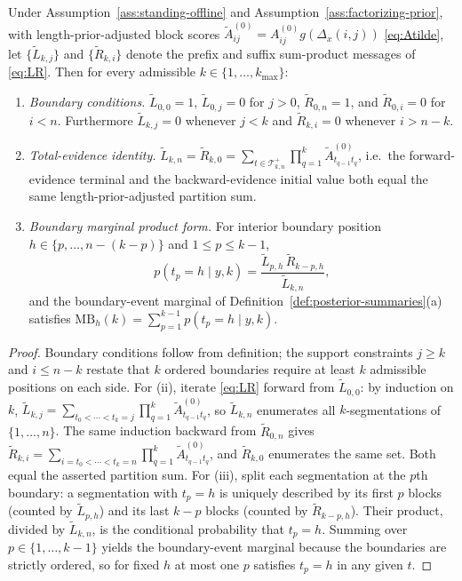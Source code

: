 \begin{proposition}
\label{prop:fb-duality}
Under Assumption~\ref{ass:standing-offline} and Assumption~\ref{ass:factorizing-prior}, with
length-prior-adjusted block scores $\widetilde A^{(0)}_{ij}=A^{(0)}_{ij}g(\Delta_x(i,j))$
\eqref{eq:Atilde}, let $\{\widetilde L_{k,j}\}$ and $\{\widetilde R_{k,i}\}$ denote the prefix and
suffix sum-product messages of \eqref{eq:LR}. Then for every admissible
$k\in\{1,\dots,k_{\max}\}$:
\begin{enumerate}[label=\textnormal{(\roman*)}]
\item \emph{Boundary conditions.}
$\widetilde L_{0,0}=1$, $\widetilde L_{0,j}=0$ for $j>0$, $\widetilde R_{0,n}=1$, and
$\widetilde R_{0,i}=0$ for $i<n$. Furthermore $\widetilde L_{k,j}=0$ whenever $j<k$ and
$\widetilde R_{k,i}=0$ whenever $i>n-k$.
\item \emph{Total-evidence identity.}
$\widetilde L_{k,n}=\widetilde R_{k,0}=\sum_{t\in\mathcal T_{k,n}^{+}}\prod_{q=1}^k \widetilde A^{(0)}_{t_{q-1}t_q}$,
i.e.\ the forward-evidence terminal and the backward-evidence initial value both equal the same
length-prior-adjusted partition sum.
\item \emph{Boundary marginal product form.}
For interior boundary position $h\in\{p,\dots,n-(k-p)\}$ and $1\le p\le k-1$,
\[
p(t_p=h\mid y,k)=\frac{\widetilde L_{p,h}\,\widetilde R_{k-p,h}}{\widetilde L_{k,n}},
\]
and the boundary-event marginal of Definition~\ref{def:posterior-summaries}(a) satisfies
$\mathrm{MB}_h(k)=\sum_{p=1}^{k-1}p(t_p=h\mid y,k)$.
\end{enumerate}
\end{proposition}

\begin{proof}
Boundary conditions follow from definition; the support constraints $j\ge k$ and $i\le n-k$
restate that $k$ ordered boundaries require at least $k$ admissible positions on each side.
For (ii), iterate \eqref{eq:LR} forward from $\widetilde L_{0,0}$: by induction on $k$,
$\widetilde L_{k,j}=\sum_{t_0<\cdots<t_k=j}\prod_{q=1}^k\widetilde A^{(0)}_{t_{q-1}t_q}$,
so $\widetilde L_{k,n}$ enumerates all $k$-segmentations of $\{1,\dots,n\}$. The same induction
backward from $\widetilde R_{0,n}$ gives $\widetilde R_{k,i}=\sum_{i=t_0<\cdots<t_k=n}\prod_{q=1}^k\widetilde A^{(0)}_{t_{q-1}t_q}$,
and $\widetilde R_{k,0}$ enumerates the same set. Both equal the asserted partition sum.
For (iii), split each segmentation at the $p$th boundary: a segmentation with $t_p=h$ is uniquely
described by its first $p$ blocks (counted by $\widetilde L_{p,h}$) and its last $k-p$ blocks
(counted by $\widetilde R_{k-p,h}$). Their product, divided by $\widetilde L_{k,n}$, is the
conditional probability that $t_p=h$. Summing over $p\in\{1,\dots,k-1\}$ yields the boundary-event
marginal because the boundaries are strictly ordered, so for fixed $h$ at most one $p$ satisfies
$t_p=h$ in any given $t$.
\end{proof}

